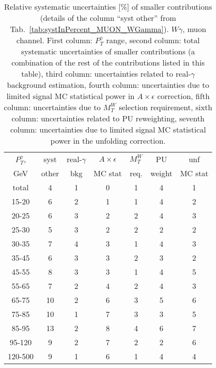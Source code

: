 \begin{table}[h]
  \scriptsize
  \begin{center}
  \caption{Relative systematic uncertainties [\%] of smaller contributions (details of the column ``syst other'' from Tab.~\ref{tab:systInPercent_MUON_WGamma}). $W\gamma$, muon channel. First column: $P_T^{\gamma}$ range, second column: total systematic uncertainties of smaller contributions (a combination of the rest of the contributions listed in this table), third column: uncertainties related to real-$\gamma$ background estimation, fourth column: uncertainties due to limited signal MC statistical power in $A\times\epsilon$ correction, fifth column: uncertainties due to $M_T^W$ selection requirement,  sixth column: uncertainties related to PU reweighting, seventh column:  uncertainties due to limited signal MC statistical power in the unfolding correction.}
  \begin{tabular}{|c|c|c|c|c|c|c|}
    $P_T^{\gamma}$,  & syst  & real-$\gamma$ & $A\times\epsilon$ & $M_T^W$ & PU    & unf      \\
    GeV            & other & bkg           & MC stat           & req.   & weight & MC stat \\ \hline
    total  & 4 & 1 & 0 & 1 & 4 & 1 \\ \hline
    15-20 & 6 & 2 & 1 & 1 & 4 & 2 \\ \hline
    20-25 & 6 & 3 & 2 & 2 & 4 & 3 \\ \hline
    25-30 & 5 & 3 & 2 & 2 & 2 & 2 \\ \hline
    30-35 & 7 & 4 & 3 & 1 & 4 & 3 \\ \hline
    35-45 & 6 & 3 & 3 & 2 & 3 & 2 \\ \hline
    45-55 & 8 & 3 & 3 & 1 & 4 & 5 \\ \hline
    55-65 & 7 & 2 & 4 & 2 & 4 & 3 \\ \hline
    65-75 & 10 & 2 & 6 & 3 & 5 & 6 \\ \hline
    75-85 & 10 & 1 & 7 & 3 & 3 & 5 \\ \hline
    85-95 & 13 & 2 & 8 & 4 & 6 & 7 \\ \hline
    95-120 & 9 & 2 & 7 & 2 & 2 & 6 \\ \hline
    120-500 & 9 & 1 & 6 & 1 & 4 & 4 \\ \hline
  \end{tabular}
  \label{tab:systInPercentSmallSysts_MUON_WGamma}
  \end{center}
\end{table}

